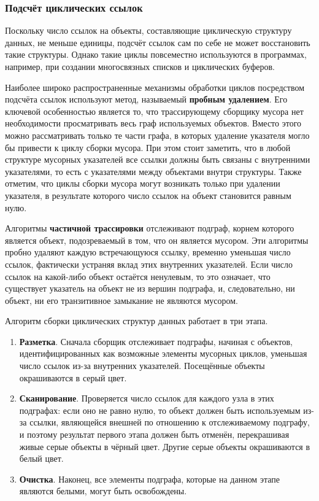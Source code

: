 \subsubsection{Подсчёт циклических ссылок}

Поскольку число ссылок на объекты, составляющие циклическую структуру данных, не меньше единицы, подсчёт ссылок сам по себе не может восстановить такие структуры. Однако
такие циклы повсеместно используются в программах, например, при создании многосвязных списков и циклических буферов. \cite{handbook}

Наиболее широко распространенные механизмы обработки циклов посредством подсчёта ссылок
используют метод, называемый \textbf{пробным удалением}. Его ключевой особенностью является то, что трассирующему сборщику мусора нет необходимости просматривать весь граф используемых объектов. Вместо этого можно рассматривать только те части графа, в которых удаление указателя могло бы привести к циклу сборки мусора. При этом стоит заметить, что в любой структуре мусорных указателей все ссылки должны быть связаны с внутренними указателями, то есть с указателями между объектами внутри структуры. Также отметим, что циклы сборки мусора могут возникать только при удалении указателя, в результате которого число ссылок на объект становится равным нулю. \cite{handbook}

Алгоритмы \textbf{частичной трассировки} отслеживают подграф, корнем которого является объект, подозреваемый в том, что он является мусором. Эти алгоритмы пробно удаляют каждую встречающуюся ссылку, временно уменьшая число ссылок, фактически устраняя вклад этих внутренних указателей. Если число ссылок на какой-либо объект остаётся ненулевым,
то это означает, что существует указатель на объект не из вершин подграфа, и, следовательно, ни объект, ни его транзитивное замыкание не являются мусором. \cite{handbook}

Алгоритм сборки циклических структур данных работает в три этапа. \cite{handbook}

\begin{enumerate}[label*=\arabic*.]
	\item \textbf{Разметка}. 
	Сначала сборщик отслеживает подграфы, начиная с объектов, идентифицированных как возможные элементы мусорных циклов, уменьшая число ссылок из-за внутренних указателей. Посещённые объекты окрашиваются в серый цвет.
	\item \textbf{Сканирование}. 
	Проверяется число ссылок для каждого узла в этих подграфах: если оно не равно нулю, то объект должен быть используемым из-за ссылки, являющейся внешней по отношению к отслеживаемому подграфу, и поэтому результат первого этапа должен быть отменён, перекрашивая живые серые объекты в чёрный цвет. Другие серые объекты окрашиваются в белый цвет.
	\item \textbf{Очистка}. 
	Наконец, все элементы подграфа, которые на данном этапе являются белыми, могут быть освобождены.
\end{enumerate}
